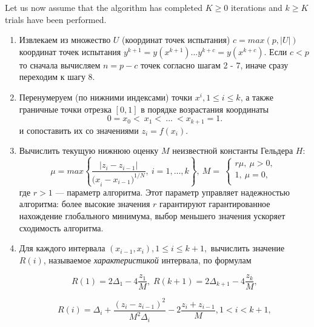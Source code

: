 \documentclass[runningheads]{llncs}
\begin{document}
Let us now assume that the algorithm has completed $K \geq 0$ iterations and $k \geq K$ trials have been performed.


\begin{enumerate}
	
	\item Извлекаем из множество $U$ (координат точек испытания) $c = max(p, |U|)$ координат точек испытания $y^{k+1}=y\left(x^{k+1}\right) ... y^{k+c}=y\left(x^{k+c}\right)$. Если $c < p$ то сначала вычисляем $n = p - c$ точек согласно шагам 2 - 7, иначе сразу переходим к шагу 8.	
	
	\item Перенумеруем (по нижними индексами) точки $x^i, 1\leq i\leq k$, а также граничные точки отрезка $[0,1]$ в порядке возрастания координаты  
	\begin{equation} 
		\label{agp1_sort} 	0=x_0<\ x_1<\ ...\ <x_{k+1}=1. 	
	\end{equation} 
	и сопоставить их со значениями $z_i=f(x_i)$. 
	
	\item  Вычислить текущую нижнюю оценку $M$ неизвестной константы Гельдера $H$: 
	\begin{equation} 
		\label{agp2_mu} 	\mu=max\left\{\frac{|z_i-z_{i-1}|}{{{(x}_i-x_{i-1})}^{1/N}},\ i=1,\ldots,k\right\},\ M=\  \left\{\begin{matrix}r\mu,\ \mu>0,\\1,\ \mu=0,\\\end{matrix}\right.\ 	
	\end{equation} 
	где $r>1$ — параметр алгоритма. Этот параметр управляет надежностью алгоритма: более высокие значения $r$ гарантируют гарантированное нахождение глобального минимума, выбор меньшего значения ускоряет сходимость алгоритма.
	
	\item  Для каждого интервала $(x_{i-1},x_i), 1\leq i\leq k+1,$ вычислить значение $R(i)$, называемое \textit{характеристикой} интервала, по формулам
	
	\begin{equation} 
		\label{agp3_R1} R(1)=2\Delta_1-4\dfrac{z_1}{M}, \; R(k+1)=2\Delta_{k+1}-4\dfrac{z_k}{M}, 
	\end{equation} 
	
	\begin{equation} 
		\label{agp3_Ri} R(i)=\Delta_i+\dfrac{(z_i-z_{i-1})^2}{M^2\Delta_i}-2\dfrac{z_i+z_{i-1}}{M},1<i<k+1, 
	\end{equation} 
	

\end{enumerate}
\end{document}
